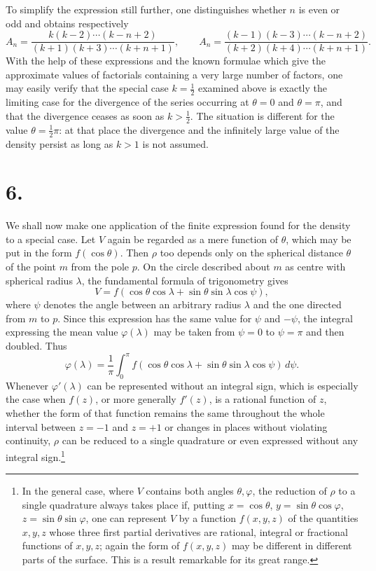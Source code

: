 \documentclass[11pt]{article}
\newcommand{\dd}{\,d}
\begin{document}
To simplify the expression still further, one distinguishes whether $n$ is even or odd and obtains respectively
\[
 A_n=\frac{k(k-2)\cdots(k-n+2)}{(k+1)(k+3)\cdots(k+n+1)},
\qquad
 A_n=\frac{(k-1)(k-3)\cdots(k-n+2)}{(k+2)(k+4)\cdots(k+n+1)}.
\]
With the help of these expressions and the known formulae which give the approximate values of factorials containing a very large number of factors, one may easily verify that the special case $k=\frac12$ examined above is exactly the limiting case for the divergence of the series occurring at $\theta=0$ and $\theta=\pi$, and that the divergence ceases as soon as $k>\frac12$. The situation is different for the value $\theta=\frac12\pi$: at that place the divergence and the infinitely large value of the density persist as long as $k>1$ is not assumed.

\section*{6.}

We shall now make one application of the finite expression found for the density to a special case. Let $V$ again be regarded as a mere function of $\theta$, which may be put in the form $f(\cos\theta)$. Then $\rho$ too depends only on the spherical distance $\theta$ of the point $m$ from the pole $p$. On the circle described about $m$ as centre with spherical radius $\lambda$, the fundamental formula of trigonometry gives
\[
 V=f(\cos\theta\cos\lambda+\sin\theta\sin\lambda\cos\psi),
\]
where $\psi$ denotes the angle between an arbitrary radius $\lambda$ and the one directed from $m$ to $p$. Since this expression has the same value for $\psi$ and $-\psi$, the integral expressing the mean value $\varphi(\lambda)$ may be taken from $\psi=0$ to $\psi=\pi$ and then doubled. Thus
\[
 \varphi(\lambda)=\frac1\pi\int_0^\pi f(\cos\theta\cos\lambda+\sin\theta\sin\lambda\cos\psi)\dd\psi.
\]
Whenever $\varphi'(\lambda)$ can be represented without an integral sign, which is especially the case when $f(z)$, or more generally $f'(z)$, is a rational function of $z$, whether the form of that function remains the same throughout the whole interval between $z=-1$ and $z=+1$ or changes in places without violating continuity, $\rho$ can be reduced to a single quadrature or even expressed without any integral sign.\footnote{In the general case, where $V$ contains both angles $\theta,\varphi$, the reduction of $\rho$ to a single quadrature always takes place if, putting $x=\cos\theta$, $y=\sin\theta\cos\varphi$, $z=\sin\theta\sin\varphi$, one can represent $V$ by a function $f(x,y,z)$ of the quantities $x,y,z$ whose three first partial derivatives are rational, integral or fractional functions of $x,y,z$; again the form of $f(x,y,z)$ may be different in different parts of the surface. This is a result remarkable for its great range.}
\end{document}
